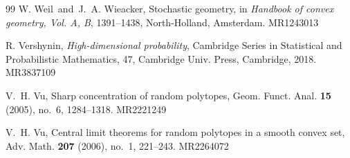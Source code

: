 \documentclass[11pt]{amsart}
\theoremstyle{definition}
\theoremstyle{plain}
\begin{document}
\begin{thebibliography}{99}
{
W. Weil\ and\ J.~A. Wieacker, Stochastic geometry, in {\it Handbook of convex geometry, Vol. A, B}, 1391--1438, North-Holland, Amsterdam. MR1243013
}

{
R. Vershynin, {\it High-dimensional probability}, Cambridge Series in Statistical and Probabilistic Mathematics, 47, Cambridge Univ. Press, Cambridge, 2018. MR3837109
}

{
V.~H. Vu, Sharp concentration of random polytopes, Geom. Funct. Anal. {\bf 15} (2005), no.~6, 1284--1318. MR2221249
}

{
V.~H. Vu, Central limit theorems for random polytopes in a smooth convex set, Adv. Math. {\bf 207} (2006), no.~1, 221--243. MR2264072
}



\end{thebibliography}
\end{document}
